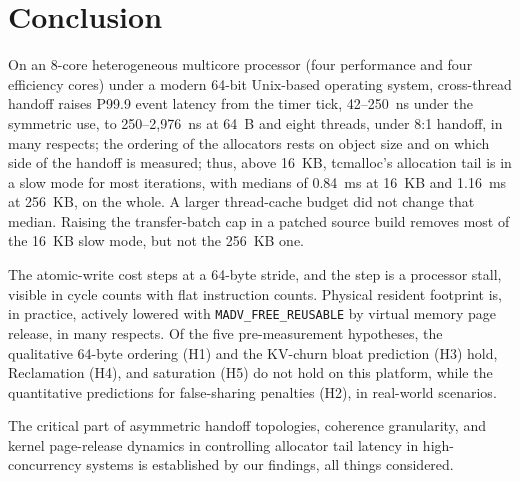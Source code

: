 \section{Conclusion}
\label{sec:conclusion}
On an 8-core heterogeneous multicore processor (four performance and four efficiency cores) under a modern 64-bit Unix-based operating system, cross-thread handoff raises P99.9 event latency from the timer tick, 42--250~ns
under the symmetric use, to 250--2{,}976~ns at 64~B and eight threads, under 8:1 handoff, in many respects; the ordering of the allocators
rests on object size and on which side of the handoff is measured; thus, above 16~KB, tcmalloc's allocation tail is in a
slow mode for most iterations, with medians of 0.84~ms at 16~KB and 1.16~ms at 256~KB, on the whole. A larger thread-cache budget
did not change that median. Raising the transfer-batch cap in a patched source build removes most of the 16~KB slow
mode, but not the 256~KB one.

The atomic-write cost steps at a 64-byte stride, and the step is a processor stall, visible in cycle counts with flat
instruction counts. Physical resident footprint is, in practice, actively lowered with \texttt{MADV\_FREE\_REUSABLE} by virtual memory page release, in many respects. Of
the five pre-measurement hypotheses, the qualitative 64-byte ordering (H1) and the KV-churn bloat prediction (H3) hold,
Reclamation (H4), and saturation (H5) do not hold on this platform, while the quantitative predictions for false-sharing penalties (H2), in real-world scenarios.

The critical part of asymmetric handoff topologies, coherence granularity, and kernel page-release dynamics in controlling allocator tail latency in high-concurrency systems is established by our findings, all things considered.
